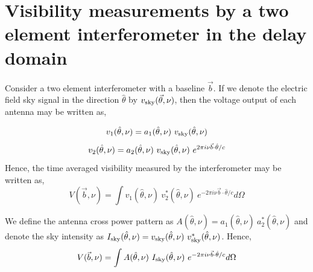 \documentclass[twocolumn]{emulateapj}
\newcommand{\volt}{{v}}
\newcommand{\vis}{{V}}
\newcommand{\sky}{{\rm sky}}
\newcommand{\bmvolt}{{a}}
\newcommand{\beam}{{A}}
\newcommand{\thhat}{{\hat\theta}}
\newcommand{\fngexp}{{e^{2\pi i\nu\vec{b}\cdot\thhat/c}}}
\newcommand{\ifngexp}{{e^{-2\pi i\nu\vec{b}\cdot\thhat/c}}}
\begin{document}
    
    \section{\textbf{Visibility measurements by a two element interferometer in the delay domain}}

    Consider a two element interferometer with a baseline $\vec b$. If we denote the electric field sky signal in the direction $\thhat$ by $\volt_\sky(\vec \theta, \nu)$, then the voltage output of each antenna may be written as,  
    
    \begin{equation}
    \volt_{1}(\thhat, \nu) = \bmvolt_{1}(\thhat,\nu)~\volt_\sky(\thhat,\nu)\nonumber\\
    \end{equation}
    \begin{equation}
    \volt_{2} (\thhat, \nu)= \bmvolt_{2}(\thhat,\nu)~\volt_\sky(\thhat,\nu)~\fngexp\nonumber\\
    \end{equation}
    Hence, the time averaged visibility measured by the interferometer may be written as, 
    \begin{equation}
    \vis(\vec b, \nu) =  \int  \volt_{1}(\thhat,\nu)~  \volt_{2}^{*} (\thhat, \nu)~ \ifngexp d\Omega 
    \label{eq1}
    \end{equation}
    
    We define the antenna cross power pattern as  $\beam(\thhat,\nu)=\bmvolt_{1}(\thhat,\nu)~\bmvolt_{2}^{*}(\thhat,\nu)$ and denote the sky intensity as  $I_\sky(\thhat,\nu)=\volt_\sky(\thhat,\nu)~\volt_\sky^{*}(\thhat,\nu)$. Hence, 
    \begin{equation}
    \vis(\vec b,\nu) = \int \beam(\thhat, \nu)~ I_\sky(\thhat,\nu)~ \ifngexp d\Omega
    \label{eq2}
    \end{equation}
    
\end{document}
